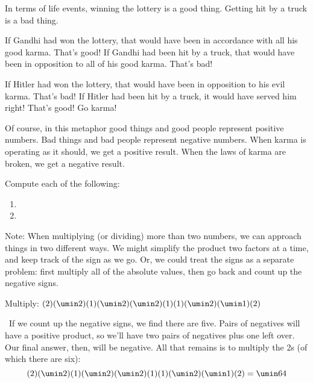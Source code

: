 In terms of life events, winning the lottery is a good thing. Getting hit by a truck is a bad thing.

If Gandhi had won the lottery, that would have been in accordance with all his good karma. That's good! If Gandhi had been hit by a truck, that would have been in opposition to all of his good karma. That's bad!

If Hitler had won the lottery, that would have been in opposition to his evil karma. That's bad! If Hitler had been hit by a truck, it would have served him right! That's good! Go karma!

Of course, in this metaphor good things and good people represent positive numbers. Bad things and bad people represent negative numbers. When karma is operating as it should, we get a positive result. When the laws of karma are broken, we get a negative result.

\begin{boxex}
Compute each of the following:

\begin{enumerate}[itemsep=10pt]
\item {}

\item {}
\end{enumerate}
\end{boxex}

Note: When multiplying (or dividing) more than two numbers, we can approach things in two different ways. We might simplify the product two factors at a time, and keep track of the sign as we go. Or, we could treat the signs as a separate problem: first multiply all of the absolute values, then go back and count up the negative signs. %

\begin{boxex}
Multiply: $(2)(\umin2)(1)(\umin2)(\umin2)(1)(1)(\umin2)(\umin1)(2)$

\exsoln\ If we count up the negative signs, we find there are five. Pairs of negatives will have a positive product, so we'll have two pairs of negatives plus one left over. Our final answer, then, will be negative. All that remains is to multiply the 2s (of which there are six): \[(2)(\umin2)(1)(\umin2)(\umin2)(1)(1)(\umin2)(\umin1)(2) = \umin64\]
\end{boxex}

